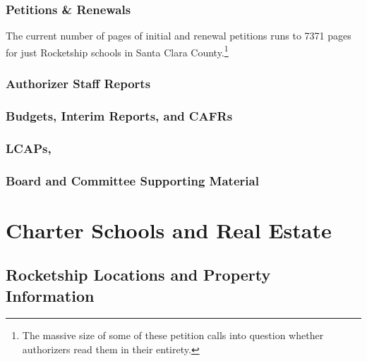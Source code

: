 \subsubsection{Petitions \& Renewals}\label{sec:petitions-renewals}\indent

The current number of pages of initial and renewal petitions runs to 7371 pages for just Rocketship schools in Santa Clara County.\footnote{The massive size of some of these petition calls into question whether authorizers read them in their entirety.}

\subsubsection{Authorizer Staff Reports}\label{sec:findings-authorizer-staff-reports}\indent

\subsubsection{Budgets, Interim Reports, and CAFRs}\label{sec:findings-budgets-etc}\indent

\subsubsection{LCAPs,}\label{sec:findings-lcaps}\indent

\subsubsection{Board and Committee Supporting Material}\label{sec:findings-board-material}\indent

\section{Charter Schools and Real Estate}\label{sec:findings-charter-real-estate}\indent

\subsection{Rocketship Locations and Property Information}\label{sec:location-and-property-info}\indent

